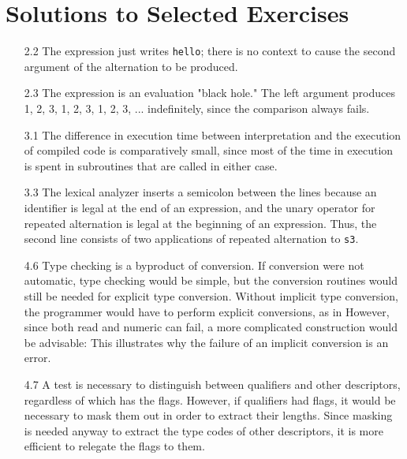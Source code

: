 \chapter{Solutions to Selected Exercises}

\begin{itemize}
\item[2.2]
The expression
just writes \texttt{hello}; there is no context to cause the second argument of the
alternation to be produced.

\goodbreak\item[2.3]
The expression
is an evaluation "black hole." The left argument produces 1, 2, 3, 1, 2, 3,
1, 2, 3, ... indefinitely, since the comparison always fails.

\goodbreak\item[3.1] The difference in execution time between interpretation and the execution
of compiled code is comparatively small, since most of the time in execution is spent
in subroutines that are called in either case.

\goodbreak\item[3.3]
The lexical analyzer inserts a semicolon between the lines
because an identifier is legal at the end of an expression, and the unary
operator for repeated alternation is legal at the beginning of an expression. 
Thus, the second line consists of two applications of repeated alternation to \texttt{s3}.

\goodbreak\item[4.6]
Type checking is a byproduct of conversion. If conversion were not
automatic, type checking would be simple, but the conversion routines
would still be needed for explicit type conversion. Without implicit type
conversion, the programmer would have to perform explicit conversions,
as in
However, since both read and numeric can fail, a more complicated construction
would be advisable:
This illustrates why the failure of an implicit conversion is an error.

\goodbreak\item[4.7]
A test is necessary to distinguish between qualifiers and other descriptors,
regardless of which has the flags. However, if qualifiers had flags, it
would be necessary to mask them out in order to extract their lengths.
Since masking is needed anyway to extract the type codes of other
descriptors, it is more efficient to relegate the flags to them.


\end{itemize}

